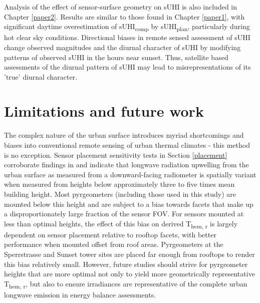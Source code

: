 \begin{bibunit}
Analysis of the effect of sensor-surface geometry on sUHI is also included in Chapter \ref{paper2}. Results are similar to those found in Chapter \ref{paper1}, with significant daytime overestimation of sUHI\textsubscript{comp} by sUHI\textsubscript{plan}, particularly during hot clear sky conditions. Directional biases in remote sensed assessment of sUHI change observed magnitudes and the diurnal character of sUHI by modifying patterns of observed sUHI in the hours near sunset. Thus, satellite based assessments of the diurnal pattern of sUHI may lead to misrepresentations of its 'true' diurnal character. 

\section{Limitations and future work}


The complex nature of the urban surface introduces myriad shortcomings and biases into conventional remote sensing of urban thermal climates - this method is no exception. Sensor placement sensitivity tests in Section \ref{placement} corroborate findings in \citet{Roberts2010,Adderley2015} and indicate that longwave radiation upwelling from the urban surface as measured from a downward-facing radiometer is spatially variant when measured from heights below approximately three to five times mean building height. Most pyrgeometers (including those used in this study) are mounted below this height and are subject to a bias towards facets that make up a disproportionately large fraction of the sensor FOV. For sensors mounted at less than optimal heights, the effect of this bias on derived T\textsubscript{hem, r} is largely dependent on sensor placement relative to rooftop facets, with better performance when mounted offset from roof areas. Pyrgeometers at the Sperrstrasse and Sunset tower sites are placed far enough from rooftops to render this bias relatively small. However, future studies should strive for pyrgeometer heights that are more optimal not only to yield more geometrically representative T\textsubscript{hem, r}, but also to ensure irradiances are representative of the complete urban longwave emission in energy balance assessments.


\end{bibunit}
